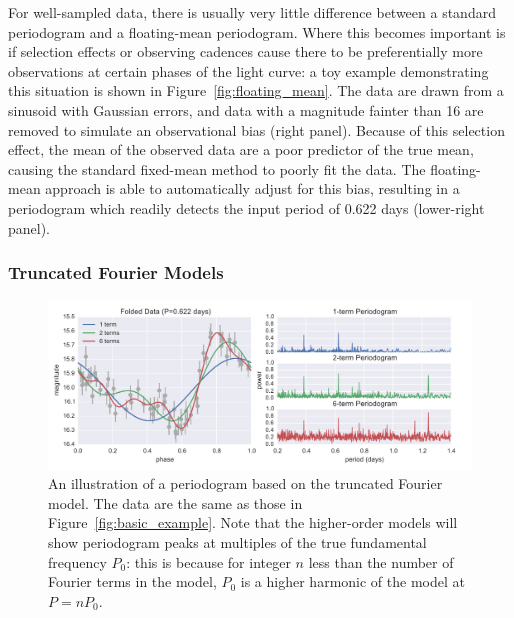 \documentclass[12pt,preprint]{aastex}
\newcommand{\Fig}[1]{Figure~\ref{fig:#1}}
\newcommand{\fig}[1]{\Fig{#1}}
\newcommand{\figlabel}[1]{\label{fig:#1}}
\newcommand{\sectlabel}[1]{\label{sect:#1}}
\begin{document}
For well-sampled data, there is usually very little difference between a standard periodogram and a floating-mean periodogram. Where this becomes important is if selection effects or observing cadences cause there to be preferentially more observations at certain phases of the light curve: a toy example demonstrating this situation is shown in \fig{floating_mean}. The data are drawn from a sinusoid with Gaussian errors, and data with a magnitude fainter than 16 are removed to simulate an observational bias (right panel). Because of this selection effect, the mean of the observed data are a poor predictor of the true mean, causing the standard fixed-mean method to poorly fit the data. The floating-mean approach is able to automatically adjust for this bias, resulting in a periodogram which readily detects the input period of 0.622 days (lower-right panel).


\subsubsection{Truncated Fourier Models}
\sectlabel{multiterm}

\begin{figure}
  \centering
  \includegraphics[width=\textwidth]{fig03.pdf}
  \caption{
    An illustration of a periodogram based on the truncated Fourier model.
    The data are the same as those in \fig{basic_example}. Note that the
    higher-order models will show periodogram peaks at multiples of the true
    fundamental frequency $P_0$: this is because for integer $n$ less than
    the number of Fourier terms in the model, $P_0$ is a higher harmonic of
    the model at $P=nP_0$.
  }
  \figlabel{multiterm_example}
\end{figure}
\end{document}
